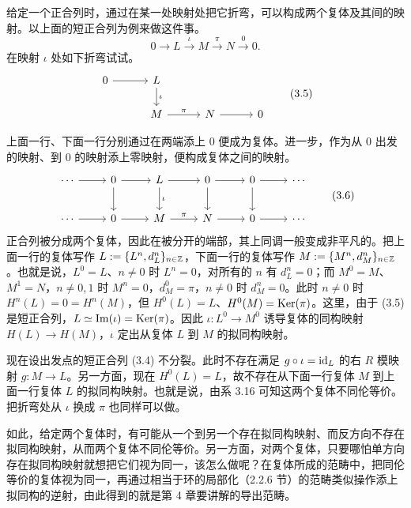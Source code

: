 给定一个正合列时，通过在某一处映射处把它折弯，可以构成两个复体及其间的映射。以上面的短正合列为例来做这件事。
\begin{equation}
0\to L\xrightarrow{\iota}M\xrightarrow{\pi}N\xrightarrow{0}0. \tag{3.4}
\end{equation}
在映射 $\iota$ 处如下折弯试试。
\begin{equation}
\begin{tikzcd}[row sep=1.7em, column sep=3.0em]
0 \arrow[r] & L \arrow[d,"\iota"] \\
& M \arrow[r,"\pi"] & N \arrow[r] & 0
\end{tikzcd} \tag{3.5}
\end{equation}

上面一行、下面一行分别通过在两端添上 $0$ 便成为复体。进一步，作为从 $0$ 出发的映射、到 $0$ 的映射添上零映射，便构成复体之间的映射。
\begin{equation}
\begin{tikzcd}[row sep=2.1em, column sep=2.5em]
\cdots \arrow[r] & 0 \arrow[r] \arrow[d] & L \arrow[r] \arrow[d,"\iota"] & 0 \arrow[r] \arrow[d] & 0 \arrow[r] \arrow[d] & \cdots \\
\cdots \arrow[r] & 0 \arrow[r] & M \arrow[r,"\pi"] & N \arrow[r] & 0 \arrow[r] & \cdots
\end{tikzcd} \tag{3.6}
\end{equation}
正合列被分成两个复体，因此在被分开的端部，其上同调一般变成非平凡的。把上面一行的复体写作 $L:=\{L^n,d_L^n\}_{n\in\mathbb{Z}}$，下面一行的复体写作 $M:=\{M^n,d_M^n\}_{n\in\mathbb{Z}}$。也就是说，$L^0=L$、$n\neq 0$ 时 $L^n=0$，对所有的 $n$ 有 $d_L^n=0$；而 $M^0=M$、$M^1=N$，$n\neq 0,1$ 时 $M^n=0$，$d_M^0=\pi$，$n\neq 0$ 时 $d_M^n=0$。此时 $n\neq 0$ 时 $H^n(L)=0=H^n(M)$，但 $H^0(L)=L$、$H^0(M)=\operatorname{Ker}(\pi)$。这里，由于 (3.5) 是短正合列，$L\simeq\operatorname{Im}(\iota)=\operatorname{Ker}(\pi)$。因此 $\iota\colon L^0\to M^0$ 诱导复体的同构映射 $H(L)\to H(M)$，$\iota$ 定出从复体 $L$ 到 $M$ 的拟同构映射。

现在设出发点的短正合列 (3.4) 不分裂。此时不存在满足 $g\circ\iota=\mathrm{id}_L$ 的右 $R$ 模映射 $g\colon M\to L$。另一方面，现在 $H^0(L)=L$，故不存在从下面一行复体 $M$ 到上面一行复体 $L$ 的拟同构映射。也就是说，由系 3.16 可知这两个复体不同伦等价。把折弯处从 $\iota$ 换成 $\pi$ 也同样可以做。

如此，给定两个复体时，有可能从一个到另一个存在拟同构映射、而反方向不存在拟同构映射，从而两个复体不同伦等价。另一方面，对两个复体，只要哪怕单方向存在拟同构映射就想把它们视为同一，该怎么做呢？在复体所成的范畴中，把同伦等价的复体视为同一，再通过相当于环的局部化（2.2.6 节）的范畴类似操作添上拟同构的逆射，由此得到的就是第 4 章要讲解的导出范畴。

